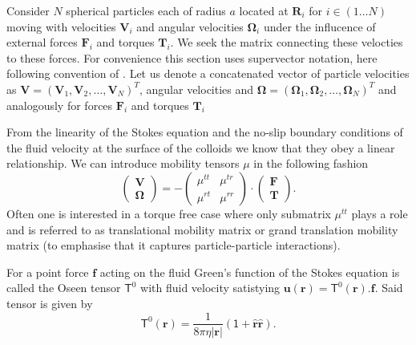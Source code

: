 \documentclass[physics]{doctoral}
\newcommand{\mm}[1]{\bm{\mathsf{#1}}} %
\begin{document}
Consider $N$ spherical particles each of radius $a$ located at $\bm{R}_i$ for $i \in (1 \dots N)$ moving with velocities $\bm{V}_i$ and angular velocities $\bm{\Omega}_i$ under the influcence of external forces $\bm{F}_i$ and torques $\bm{T}_i$.
We seek the matrix connecting these velocties to these forces.
For convenience this section uses supervector notation, here following convention of \cite{Nagele_2013}.
Let us denote a concatenated vector of particle velocities as $\bm{V} = (\bm{V}_1,\bm{V}_2,\dots,\bm{V}_N)^{T}$, angular velocities and $\bm{\Omega} = (\bm{\Omega}_1,\bm{\Omega}_2,\dots,\bm{\Omega}_N)^{T}$ and analogously for forces $\bm{F}_i$ and torques $\bm{T}_i$ 

From the linearity of the Stokes equation and the no-slip boundary conditions of the fluid velocity at the surface of the colloids we know that they obey a linear relationship.
We can introduce mobility tensors $\mm{\mu}$ in the following fashion
\begin{equation}
    \begin{pmatrix}
        \bm{V} \\
        \bm{\Omega}
    \end{pmatrix}
    = -
    \begin{pmatrix}
        \mm{\mu}^{tt} & \mm{\mu}^{tr} \\
        \mm{\mu}^{rt} & \mm{\mu}^{rr}
    \end{pmatrix}
    \cdot
    \begin{pmatrix}
        \bm{F} \\
        \bm{T}
    \end{pmatrix}
    .
    \label{eqn:mobility-matrix-definition}
\end{equation}
Often one is interested in a torque free case where only submatrix $\mm{\mu}^{tt}$ plays a role and is referred to as translational mobility matrix or grand translation mobility matrix (to emphasise that it captures particle-particle interactions).

For a point force $\bm{f}$ acting on the fluid Green's function of the Stokes equation is called the Oseen tensor $\mm{T}^0$ with fluid velocity satistying $\bm{u}(\bm{r}) = \mm{T}^{0}(\bm{r}).
    \bm{f}$.
Said tensor is given by
\begin{equation}
    \mm{T}^{0}(\bm{r}) = \frac{1}{8\pi\eta |\bm{r}|} \left( \mm{1} + \bm{\hat{r}}\bm{\hat{r}}\right).
\end{equation}
\end{document}
